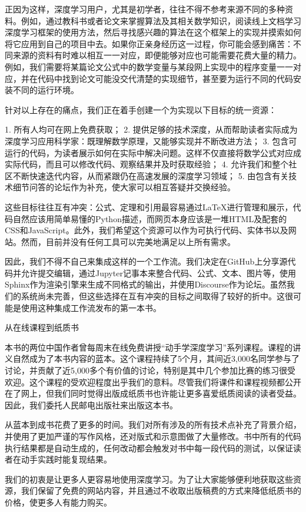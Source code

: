 正因为这样，深度学习用户，尤其是初学者，往往不得不参考来源不同的多种资料。例如，通过教科书或者论文来掌握算法及其相关数学知识，阅读线上文档学习深度学习框架的使用方法，然后寻找感兴趣的算法在这个框架上的实现并摸索如何将它应用到自己的项目中去。如果你正亲身经历这一过程，你可能会感到痛苦：不同来源的资料有时难以相互一一对应，即便能够对应也可能需要花费大量的精力。例如，我们需要将某篇论文公式中的数学变量与某段网上实现中的程序变量一一对应，并在代码中找到论文可能没交代清楚的实现细节，甚至要为运行不同的代码安装不同的运行环境。

针对以上存在的痛点，我们正在着手创建一个为实现以下目标的统一资源：

1. 所有人均可在网上免费获取；
2. 提供足够的技术深度，从而帮助读者实际成为深度学习应用科学家：既理解数学原理，又能够实现并不断改进方法；
3. 包含可运行的代码，为读者展示如何在实际中解决问题。这样不仅直接将数学公式对应成实际代码，而且可以修改代码、观察结果并及时获取经验；
4. 允许我们和整个社区不断快速迭代内容，从而紧跟仍在高速发展的深度学习领域；
5. 由包含有关技术细节问答的论坛作为补充，使大家可以相互答疑并交换经验。

这些目标往往互有冲突：公式、定理和引用最容易通过LaTeX进行管理和展示，代码自然应该用简单易懂的Python描述，而网页本身应该是一堆HTML及配套的CSS和JavaScript。此外，我们希望这个资源可以作为可执行代码、实体书以及网站。然而，目前并没有任何工具可以完美地满足以上所有需求。

因此，我们不得不自己来集成这样的一个工作流。我们决定在GitHub上分享源代码并允许提交编辑，通过Jupyter记事本来整合代码、公式、文本、图片等，使用Sphinx作为渲染引擎来生成不同格式的输出，并使用Discourse作为论坛。虽然我们的系统尚未完善，但这些选择在互有冲突的目标之间取得了较好的折中。这很可能是使用这种集成工作流发布的第一本书。

 从在线课程到纸质书

本书的两位中国作者曾每周末在线免费讲授“动手学深度学习”系列课程。课程的讲义自然成为了本书内容的蓝本。这个课程持续了5个月，其间近3,000名同学参与了讨论，并贡献了近5,000多个有价值的讨论，特别是其中几个参加比赛的练习很受欢迎。这个课程的受欢迎程度出乎我们的意料。尽管我们将课件和课程视频都公开在了网上，但我们同时觉得出版成纸质书也许能让更多喜爱纸质阅读的读者受益。因此，我们委托人民邮电出版社来出版这本书。

从蓝本到成书花费了更多的时间。我们对所有涉及的所有技术点补充了背景介绍，并使用了更加严谨的写作风格，还对版式和示意图做了大量修改。书中所有的代码执行结果都是自动生成的，任何改动都会触发对书中每一段代码的测试，以保证读者在动手实践时能复现结果。

我们的初衷是让更多人更容易地使用深度学习。为了让大家能够便利地获取这些资源，我们保留了免费的网站内容，并且通过不收取出版稿费的方式来降低纸质书的价格，使更多人有能力购买。

